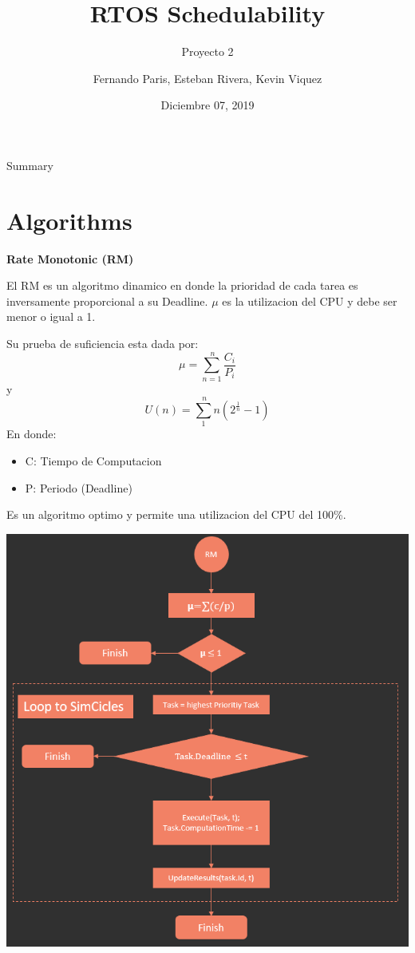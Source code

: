 \documentclass[aspectratio=43, xcolor=table]{beamer}
\title{RTOS Schedulability}
\subtitle{Proyecto 2}
\author[F. Paris, E. Rivera, K. Viquez]{Fernando Paris, Esteban Rivera, Kevin Viquez}
\institute[ITCR]{
    Maestria en Sistemas Empotrados%
    \\%
    Instituto Tenologico de Costa Rica%
}\date{Diciembre 07, 2019}
\begin{document}
\frame{\titlepage}

\begin{frame}{Summary}
\tableofcontents
\end{frame}

\section{Algorithms}

\frame{\sectionpage}

\twocolumn
\begin{normal}
\textbf{Rate Monotonic (RM)}
\vspace{4mm}
\end{normal}

\begin{footnotesize}
El RM es un algoritmo dinamico en donde la prioridad de cada tarea  es inversamente proporcional a su Deadline.  $\mu$ es la utilizacion del CPU y debe ser menor o igual a 1. 

\vspace{4mm}
Su prueba de suficiencia esta dada por:
\[ \mu = \sum_{n=1}^{\ n} \frac{C_{i}}{P_{i}} \] y \[  U(n) = \sum_{1}^{\ n} n(2^{\frac{1}{n}} - 1) \]
En donde:
\begin{itemize}
\item C: Tiempo de Computacion
\item P: Periodo (Deadline)
\end{itemize}
Es un algoritmo optimo y permite una utilizacion del CPU del 100\%.

\begin{center}
\includegraphics[scale=0.3]{RM}
\end{center}
\onecolumn
\end{footnotesize}
\end{document}

